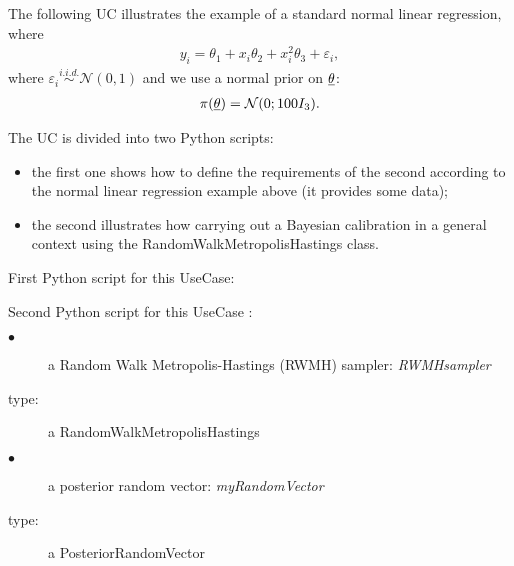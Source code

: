 The following UC illustrates the example of a standard normal linear regression, where
\begin{align*}
  y_i = \theta_1 + x_i \theta_2 + x_i^2 \theta_3 + \varepsilon_i,
\end{align*}
where $\varepsilon_i \stackrel{i.i.d.}{\sim} \mathcal N(0, 1)$
and we use a normal prior on ${\underline{\theta}}$:
\begin{align*}
  \pi({\underline{\theta}}) = \mathcal N(0 ; 100 I_3).
\end{align*}

The UC is divided into two Python scripts:
\begin{itemize}
\item the first one shows how to define the requirements of the second
  according to the normal linear regression example above (it provides
  some data);
\item the second illustrates how carrying out a Bayesian calibration
  in a general context using the RandomWalkMetropolisHastings class.
\end{itemize}

First Python script for this UseCase:


\newpage

Second Python script for this UseCase :

             {
               \begin{description}
               \item[$\bullet$] a Random Walk Metropolis-Hastings (RWMH) sampler: {\itshape RWMHsampler}
               \item[type:] a RandomWalkMetropolisHastings
               \item[$\bullet$] a posterior random vector: {\itshape myRandomVector}
               \item[type:] a PosteriorRandomVector
               \end{description}
             }

